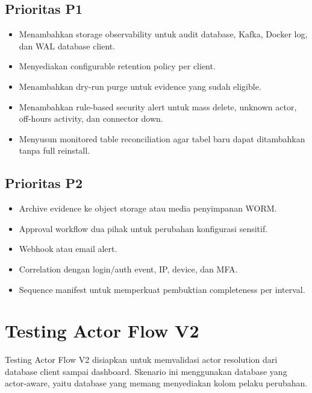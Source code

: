 \subsection{Prioritas P1}

\begin{itemize}
    \item Menambahkan storage observability untuk audit database, Kafka, Docker log, dan WAL database client.
    \item Menyediakan configurable retention policy per client.
    \item Menambahkan dry-run purge untuk evidence yang sudah eligible.
    \item Menambahkan rule-based security alert untuk mass delete, unknown actor, off-hours activity, dan connector down.
    \item Menyusun monitored table reconciliation agar tabel baru dapat ditambahkan tanpa full reinstall.
\end{itemize}

\subsection{Prioritas P2}

\begin{itemize}
    \item Archive evidence ke object storage atau media penyimpanan WORM.
    \item Approval workflow dua pihak untuk perubahan konfigurasi sensitif.
    \item Webhook atau email alert.
    \item Correlation dengan login/auth event, IP, device, dan MFA.
    \item Sequence manifest untuk memperkuat pembuktian completeness per interval.
\end{itemize}

\section{Testing Actor Flow V2}

Testing Actor Flow V2 disiapkan untuk memvalidasi actor resolution dari database client sampai dashboard. Skenario ini menggunakan database yang actor-aware, yaitu database yang memang menyediakan kolom pelaku perubahan.

